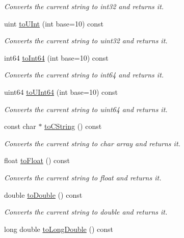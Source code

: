 \begin{DoxyCompactItemize}
\begin{DoxyCompactList}\small\item\em Converts the current string to int32 and returns it. \end{DoxyCompactList}\item 
uint \mbox{\hyperlink{class_a_string_ad674ff871fa6106dc82f3e03acec3639}{to\+U\+Int}} (int base=10) const
\begin{DoxyCompactList}\small\item\em Converts the current string to uint32 and returns it. \end{DoxyCompactList}\item 
int64 \mbox{\hyperlink{class_a_string_affa719b95e059f7c0ef8eb43b3a892bf}{to\+Int64}} (int base=10) const
\begin{DoxyCompactList}\small\item\em Converts the current string to int64 and returns it. \end{DoxyCompactList}\item 
uint64 \mbox{\hyperlink{class_a_string_a92130012ffd32a72fe43750592e70ef5}{to\+U\+Int64}} (int base=10) const
\begin{DoxyCompactList}\small\item\em Converts the current string to uint64 and returns it. \end{DoxyCompactList}\item 
const char $\ast$ \mbox{\hyperlink{class_a_string_ab0a1fc558e39014f0feffc055c1fa47b}{to\+C\+String}} () const
\begin{DoxyCompactList}\small\item\em Converts the current string to char array and returns it. \end{DoxyCompactList}\item 
float \mbox{\hyperlink{class_a_string_a101d529c5dfb9803eac440e6f3819cda}{to\+Float}} () const
\begin{DoxyCompactList}\small\item\em Converts the current string to float and returns it. \end{DoxyCompactList}\item 
double \mbox{\hyperlink{class_a_string_ad44ce14af9b6948b4be656e5ccafa0b8}{to\+Double}} () const
\begin{DoxyCompactList}\small\item\em Converts the current string to double and returns it. \end{DoxyCompactList}\item 
long double \mbox{\hyperlink{class_a_string_a7ce9b9dd2163dac80a4a80e5cb81878a}{to\+Long\+Double}} () const

\end{DoxyCompactItemize}

